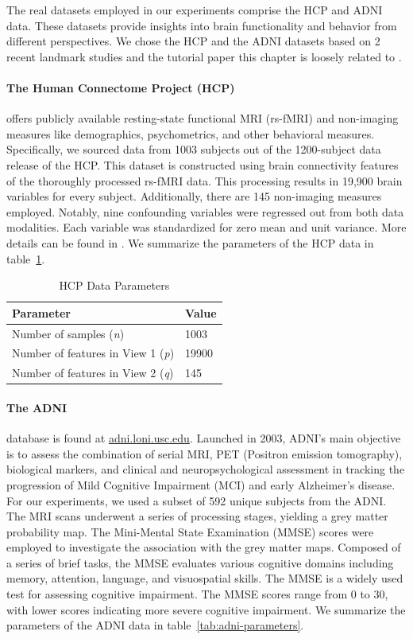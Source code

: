 The real datasets employed in our experiments comprise the HCP and ADNI data.
These datasets provide insights into brain functionality and behavior from different perspectives.
We chose the HCP and the ADNI datasets based on 2 recent landmark studies and the tutorial paper this chapter is loosely related to \cite{mihalik2022canonical}.

\paragraph{The Human Connectome Project (HCP)} offers publicly available resting-state functional MRI (rs-fMRI) and non-imaging measures like demographics, psychometrics, and other behavioral measures.
Specifically, we sourced data from 1003 subjects out of the 1200-subject data release of the HCP.
This dataset is constructed using brain connectivity features of the thoroughly processed rs-fMRI data.
This processing results in 19,900 brain variables for every subject.
Additionally, there are 145 non-imaging measures employed.
Notably, nine confounding variables were regressed out from both data modalities.
Each variable was standardized for zero mean and unit variance.
More details can be found in \cite{smith2015positive, mihalik2022canonical}.
We summarize the parameters of the HCP data in table~\ref{tab:hcp-parameters}.

\begin{table}
\centering
\caption{HCP Data Parameters}
\begin{tabular}{| l | l |}
\hline
\textbf{Parameter} & \textbf{Value} \\
\hline
Number of samples (\textit{n}) & 1003 \\
Number of features in View 1 (\textit{p}) & 19900 \\
Number of features in View 2 (\textit{q}) & 145 \\
\hline
\end{tabular}\label{tab:hcp-parameters}
\end{table}

\paragraph{The ADNI} database is found at \url{adni.loni.usc.edu}.
Launched in 2003, ADNI's main objective is to assess the combination of serial MRI, PET (Positron emission tomography), biological markers, and clinical and neuropsychological assessment in tracking the progression of Mild Cognitive Impairment (MCI) and early Alzheimer’s disease.
For our experiments, we used a subset of 592 unique subjects from the ADNI. The MRI scans underwent a series of processing stages, yielding a grey matter probability map.
The Mini-Mental State Examination (MMSE) scores were employed to investigate the association with the grey matter maps.
Composed of a series of brief tasks, the MMSE evaluates various cognitive domains including memory, attention, language, and visuospatial skills.
The MMSE is a widely used test for assessing cognitive impairment.
The MMSE scores range from 0 to 30, with lower scores indicating more severe cognitive impairment.
We summarize the parameters of the ADNI data in table~\ref{tab:adni-parameters}.

